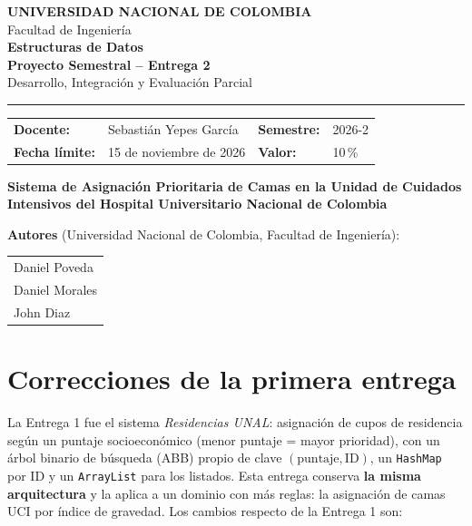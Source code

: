 \documentclass[11pt,a4paper]{article}
\begin{document}
\begin{center}
{\large\textbf{UNIVERSIDAD NACIONAL DE COLOMBIA}}\\ Facultad de Ingeniería\\[4pt]
{\Large\textbf{Estructuras de Datos}}\\[2pt]
{\color{unal}\textbf{Proyecto Semestral -- Entrega 2}}\\
Desarrollo, Integración y Evaluación Parcial\\[6pt]
\rule{\linewidth}{0.8pt}
\end{center}

\begin{tabularx}{\linewidth}{@{}lXlX@{}}
\textbf{Docente:} & Sebastián Yepes García & \textbf{Semestre:} & 2026-2\\
\textbf{Fecha límite:} & 15 de noviembre de 2026 & \textbf{Valor:} & 10\,\%\\
\end{tabularx}

\vspace{4pt}
\begin{center}
{\LARGE\textbf{Sistema de Asignación Prioritaria de Camas en la Unidad de Cuidados Intensivos del Hospital Universitario Nacional de Colombia}}
\end{center}

\textbf{Autores} (Universidad Nacional de Colombia, Facultad de Ingeniería):\\
\begin{tabular}{@{}l@{}}
Daniel Poveda\\
Daniel Morales\\
John Diaz\\
\end{tabular}

\section{Correcciones de la primera entrega}
La Entrega 1 fue el sistema \emph{Residencias UNAL}: asignación de cupos de residencia según un puntaje socioeconómico (menor puntaje = mayor prioridad), con un árbol binario de búsqueda (ABB) propio de clave $(\text{puntaje},\text{ID})$, un \texttt{HashMap} por ID y un \texttt{ArrayList} para los listados. Esta entrega conserva \textbf{la misma arquitectura} y la aplica a un dominio con más reglas: la asignación de camas UCI por índice de gravedad. Los cambios respecto de la Entrega 1 son:
\end{document}
